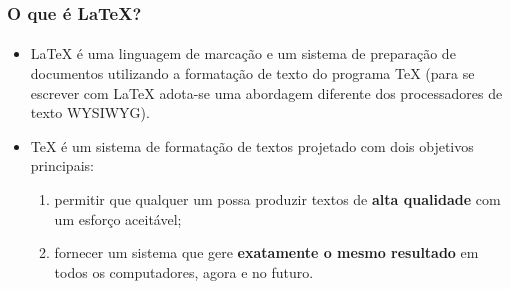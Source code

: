 \begin{frame}
\frametitle{O que é \LaTeX{}?}
\framesubtitle{}
\begin{itemize}
  \item \LaTeX{} é uma linguagem de marcação e um sistema de preparação de documentos utilizando a formatação de texto do programa \TeX{} (para se escrever com \LaTeX{} adota-se uma abordagem diferente dos processadores de texto WYSIWYG).
  \item \TeX{} é um sistema de formatação de textos projetado com dois objetivos principais:
  \begin{enumerate}
      \item permitir que qualquer um possa produzir textos de \textbf{alta qualidade} com um esforço aceitável;
      \item fornecer um sistema que gere \textbf{exatamente o mesmo resultado} em todos os computadores, agora e no futuro.
  \end{enumerate}
\end{itemize}
\end{frame}


